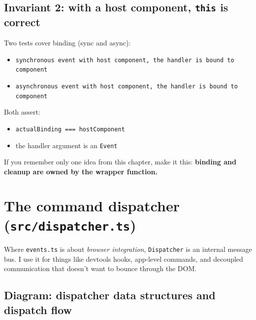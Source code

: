 \subsection{Invariant 2: with a host component, \texttt{this} is correct}
Two tests cover binding (sync and async):

\begin{itemize}
  \item \texttt{synchronous event with host component, the handler is bound to component}
  \item \texttt{asynchronous event with host component, the handler is bound to component}
\end{itemize}

Both assert:

\begin{itemize}
  \item \texttt{actualBinding === hostComponent}
  \item the handler argument is an \texttt{Event}
\end{itemize}

If you remember only one idea from this chapter, make it this: \textbf{binding and cleanup are owned by the wrapper function.}

\section{The command dispatcher (\texttt{src/dispatcher.ts})}
Where \texttt{events.ts} is about \emph{browser integration}, \texttt{Dispatcher} is an internal message bus.
I use it for things like devtools hooks, app-level commands, and decoupled communication that doesn't want to bounce through the DOM.

\subsection*{Diagram: dispatcher data structures and dispatch flow}
\begin{center}
\end{center}

